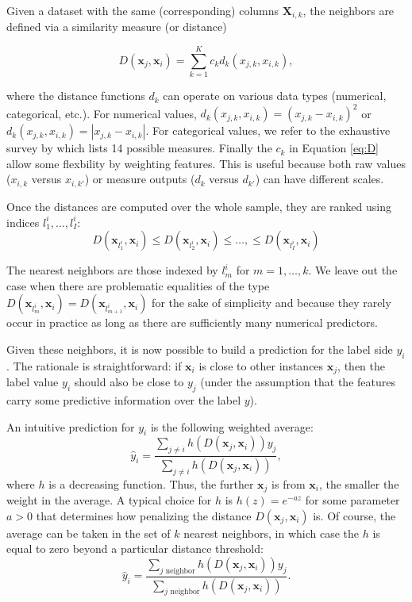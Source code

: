 Given a dataset with the same (corresponding) columns $\textbf{X}_{i,k}$, the neighbors are defined via a similarity measure (or distance)

\begin{equation}
\label{eq:D}
D(\textbf{x}_j,\textbf{x}_i)=\sum_{k=1}^Kc_k d_k(x_{j,k},x_{i,k}),
\end{equation}

where the distance functions $d_k$ can operate on various data types (numerical, categorical, etc.). For numerical values, $d_k(x_{j,k},x_{i,k})=(x_{j,k} -x_{i,k})^2$ or $d_k(x_{j,k},x_{i,k})=|x_{j,k} -x_{i,k}|$. For categorical values, we refer to the exhaustive survey by \cite{boriah2008similarity} which lists 14 possible measures. Finally the $c_k$ in Equation \ref{eq:D} allow some flexbility by weighting features. This is useful because both raw values ($x_{i,k}$ versus $x_{i,k'}$) or measure outputs ($d_k$ versus $d_{k'}$) can have different scales.

Once the distances are computed over the whole sample, they are ranked using indices $l_1^i, \dots, l_I^i$:
\begin{equation}
D\left(\textbf{x}_{l_1^i},\textbf{x}_i\right) \le D\left(\textbf{x}_{l_2^i},\textbf{x}_i\right) \le \dots, \le D\left(\textbf{x}_{l_I^i},\textbf{x}_i\right)
\end{equation}

The nearest neighbors are those indexed by $l_m^i$ for $m=1,\dots,k$. We leave out the case when there are problematic equalities of the type $D\left(\textbf{x}_{l_m^i},\textbf{x}_i\right)=D\left(\textbf{x}_{l_{m+1}^i},\textbf{x}_i\right)$ for the sake of simplicity and because they rarely occur in practice as long as there are sufficiently many numerical predictors.

Given these neighbors, it is now possible to build a prediction for the label side $y_i$. The rationale is straightforward: if $\textbf{x}_i$ is close to other instances $\textbf{x}_j$, then the label value $y_i$ should also be close to $y_j$ (under the assumption that the features carry some predictive information over the label $y$).

An intuitive prediction for $y_i$ is the following weighted average:
\begin{equation}
\hat{y}_i=\frac{\sum_{j\neq i} h(D(\textbf{x}_j,\textbf{x}_i)) y_j}{\sum_{j\neq i} h(D(\textbf{x}_j,\textbf{x}_i))},
\end{equation}
where $h$ is a decreasing function. Thus, the further $\textbf{x}_j$ is from $\textbf{x}_i$, the smaller the weight in the average. A typical choice for $h$ is $h(z)=e^{ -az}$ for some parameter $a>0$ that determines how penalizing the distance $D(\textbf{x}_j,\textbf{x}_i)$ is. Of course, the average can be taken in the set of $k$ nearest neighbors, in which case the $h$ is equal to zero beyond a particular distance threshold:
\begin{equation}
\hat{y}_i=\frac{\sum_{j \text{ neighbor}} h(D(\textbf{x}_j,\textbf{x}_i)) y_j}{\sum_{j \text{ neighbor}} h(D(\textbf{x}_j,\textbf{x}_i))}.
\end{equation}

